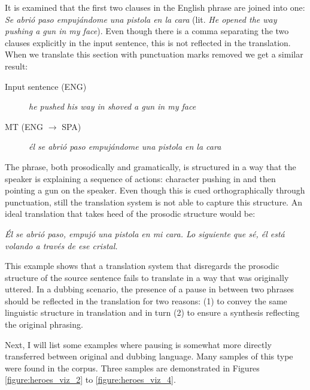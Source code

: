 It is examined that the first two clauses in the English phrase are joined into one: \textit{Se abrió paso empujándome una pistola en la cara} (lit. \textit{He opened the way pushing a gun in my face}). Even though there is a comma separating the two clauses explicitly in the input sentence, this is not reflected in the translation. When we translate this section with punctuation marks removed we get a similar result:

\begin{description}
\item [Input sentence (ENG)] {\it he pushed his way in shoved a gun in my face} 
\item [MT (ENG $\rightarrow$ SPA)] {\it él se abrió paso empujándome una pistola en la cara}
\end{description}

The phrase, both prosodically and gramatically, is structured in a way that the speaker is explaining a sequence of actions: character pushing in and then pointing a gun on the speaker. Even though this is cued orthographically through punctuation, still the translation system is not able to capture this structure. An ideal translation that takes heed of the prosodic structure would be:

\begin{description}
    \item \textit{Él se abrió paso, empujó una pistola en mi cara. Lo siguiente que sé, él está volando a través de ese cristal.}
\end{description}

This example shows that a translation system that disregards the prosodic structure of the source sentence fails to translate in a way that was originally uttered. In a dubbing scenario, the presence of a pause in between two phrases should be reflected in the translation for two reasons: (1) to convey the same linguistic structure in translation and in turn (2) to ensure a synthesis reflecting the original phrasing. 

Next, I will list some examples where pausing is somewhat more directly transferred between original and dubbing language. Many samples of this type were found in the corpus. Three samples are demonstrated in Figures \ref{figure:heroes_viz_2} to \ref{figure:heroes_viz_4}. 

